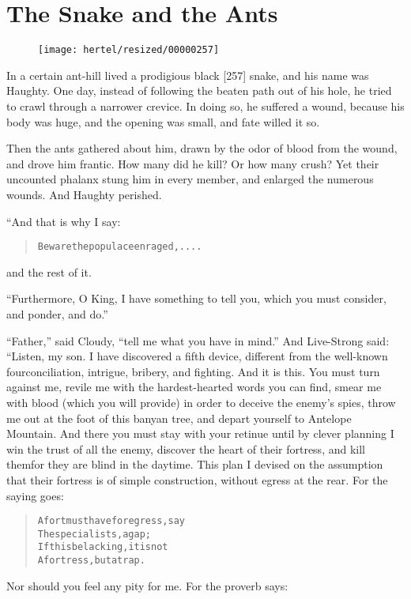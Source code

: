 \documentclass[article, twoside, 10pt]{memoir}
\renewenvironment{verbatim}{%
\begin{quote}%
\vskip -10pt%
\begin{alltt}\normalfont\small}{\end{alltt}%
\end{quote}%
\vskip -10pt
} %
\begin{document}
\chapter{The Snake and the Ants}

\begin{figure}[p]\texttt{[image: hertel/resized/00000257]}\end{figure}In a certain ant-hill lived a prodigious black [257] snake, and his
name was Haughty. One day, instead of following the beaten path out
of his hole, he tried to crawl through a narrower crevice. In doing
so, he suffered a wound, because his body was huge, and the opening
was small, and fate willed it so.

Then the ants gathered about him, drawn by the odor of blood from
the wound, and drove him frantic. How many did he kill? Or how many
crush? Yet their uncounted phalanx stung him in every member, and
enlarged the numerous wounds. And Haughty perished.

“And that is why I say:

\begin{verbatim}
Beware the populace enraged, ....
\end{verbatim}
and the rest of it.

``Furthermore, O King, I have something to tell you, which you must consider, and ponder, and do.''

``Father,'' said Cloudy, ``tell me what you have in mind.'' And
Live-Strong said: “Listen, my son. I have discovered a fifth
device, different from the well-known four{\textemdash}conciliation,
intrigue, bribery, and fighting. And it is this. You must turn
against me, revile me with the hardest-hearted words you can find,
smear me with blood (which you will provide) in order to deceive
the enemy's spies, throw me out at the foot of this banyan tree,
and depart yourself to Antelope Mountain. And there you must stay
with your retinue until by clever planning I win the trust of all
the enemy, discover the heart of their fortress, and kill
them{\textemdash}for they are blind in the daytime. This plan I devised on
the assumption that their fortress is of simple construction,
without egress at the rear. For the saying goes:

\begin{verbatim}
A fort must have for egress, say
    The specialists, a gap;
If this be lacking, it is not
    A fortress, but a trap.
\end{verbatim}
Nor should you feel any pity for me. For the proverb says:
\end{document}
